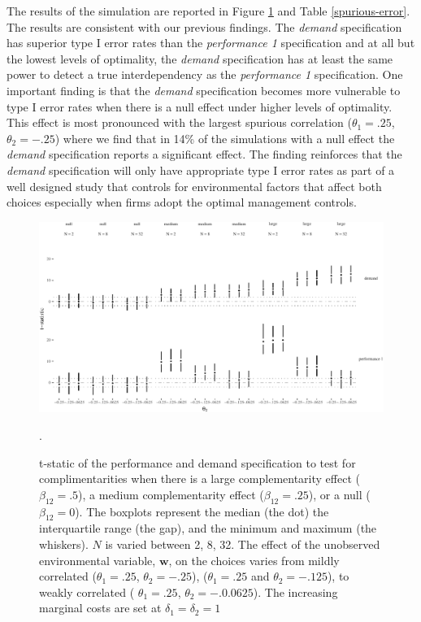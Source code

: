 \documentclass[12pt]{article}
\begin{document}
The results of the simulation are reported in Figure \ref{spurious} and
Table \ref{spurious-error}. The results are consistent with our previous
findings. The \emph{demand} specification has superior type I error
rates than the \emph{performance 1} specification and at all but the
lowest levels of optimality, the \emph{demand} specification has at
least the same power to detect a true interdependency as the
\emph{performance 1} specification. One important finding is that the
\emph{demand} specification becomes more vulnerable to type I error
rates when there is a null effect under higher levels of optimality.
This effect is most pronounced with the largest spurious correlation
(\(\theta_1 = .25\), \(\theta_2 = -.25\)) where we find that in 14\% of
the simulations with a null effect the \emph{demand} specification
reports a significant effect. The finding reinforces that the
\emph{demand} specification will only have appropriate type I error
rates as part of a well designed study that controls for environmental
factors that affect both choices especially when firms adopt the optimal
management controls.

\begin{figure}

\includegraphics[width=500px]{figure-latex/spurious-plot-1}
\caption[Error Rate and Power with Unobserved Environmental Variables]
{\label{spurious} t-static of the performance and demand specification to test
for complimentarities when there is a large complementarity effect
($\beta_{12} = .5$), a medium complementarity effect ($\beta_{12} = .25$),
or a null ($\beta_{12} = 0$). The boxplots represent the median (the dot) the
interquartile range (the gap), and the minimum and maximum (the whiskers). $N$
is varied between 2, 8, 32. The effect of the unobserved environmental variable,
$\mathbf{w}$, on the choices varies from mildly correlated ($\theta_1 = .25$,
$\theta_2 = -.25$), ($\theta_1 = .25$ and $\theta_2 = -.125$),
to weakly correlated ( $\theta_1 =.25$, $\theta_2 = -.0.0625$). The increasing
marginal costs are set at $\delta_1 = \delta_2 = 1$}.
\end{figure}
\end{document}
